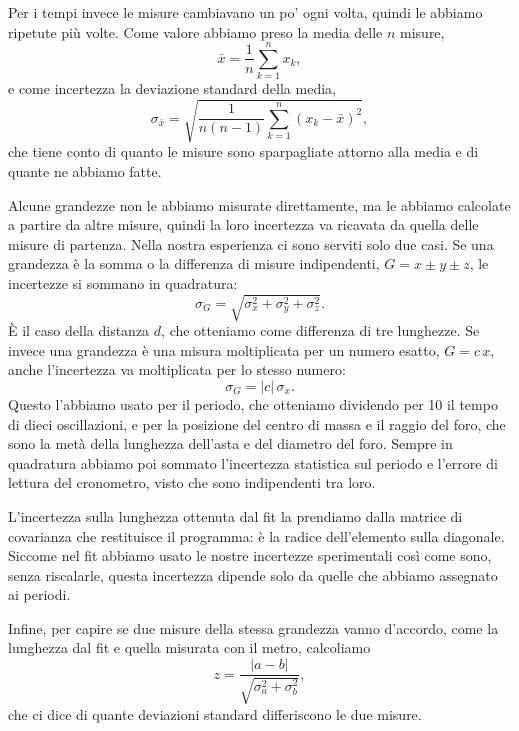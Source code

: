 \documentclass[a4paper]{article}
\begin{document}
Per i tempi invece le misure cambiavano un po' ogni volta, quindi le abbiamo ripetute pi\`u volte. Come valore abbiamo preso la media delle $n$ misure,
\begin{equation}
    \bar{x} = \frac{1}{n}\sum_{k=1}^{n} x_k ,
\end{equation}
e come incertezza la deviazione standard della media,
\begin{equation}
    \sigma_{\bar{x}} = \sqrt{\frac{1}{n(n-1)}\sum_{k=1}^{n} (x_k - \bar{x})^2} ,
\end{equation}
che tiene conto di quanto le misure sono sparpagliate attorno alla media e di quante ne abbiamo fatte.

Alcune grandezze non le abbiamo misurate direttamente, ma le abbiamo calcolate a partire da altre misure, quindi la loro incertezza va ricavata da quella delle misure di partenza. Nella nostra esperienza ci sono serviti solo due casi. Se una grandezza \`e la somma o la differenza di misure indipendenti, $G = x \pm y \pm z$, le incertezze si sommano in quadratura:
\begin{equation}
    \sigma_G = \sqrt{\sigma_x^2 + \sigma_y^2 + \sigma_z^2} .
\end{equation}
\`E il caso della distanza $d$, che otteniamo come differenza di tre lunghezze. Se invece una grandezza \`e una misura moltiplicata per un numero esatto, $G = c\,x$, anche l'incertezza va moltiplicata per lo stesso numero:
\begin{equation}
    \sigma_G = |c|\,\sigma_x .
\end{equation}
Questo l'abbiamo usato per il periodo, che otteniamo dividendo per 10 il tempo di dieci oscillazioni, e per la posizione del centro di massa e il raggio del foro, che sono la met\`a della lunghezza dell'asta e del diametro del foro. Sempre in quadratura abbiamo poi sommato l'incertezza statistica sul periodo e l'errore di lettura del cronometro, visto che sono indipendenti tra loro.

L'incertezza sulla lunghezza ottenuta dal fit la prendiamo dalla matrice di covarianza che restituisce il programma: \`e la radice dell'elemento sulla diagonale. Siccome nel fit abbiamo usato le nostre incertezze sperimentali cos\`i come sono, senza riscalarle, questa incertezza dipende solo da quelle che abbiamo assegnato ai periodi.

Infine, per capire se due misure della stessa grandezza vanno d'accordo, come la lunghezza dal fit e quella misurata con il metro, calcoliamo
\begin{equation}
    z = \frac{|a - b|}{\sqrt{\sigma_a^2 + \sigma_b^2}} ,
\end{equation}
che ci dice di quante deviazioni standard differiscono le due misure.
\end{document}
